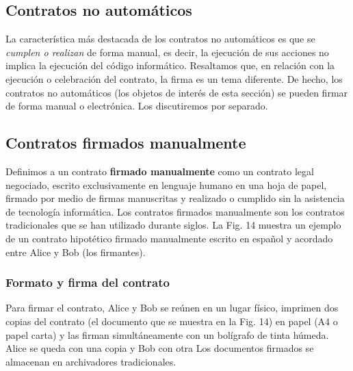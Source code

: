 \documentclass[12pt]{report} %
\begin{document}
\begin{itemize}
\section{ Contratos no automáticos }

La característica más destacada de los contratos no automáticos es que se \textit{cumplen o realizan} de forma manual, es decir, la ejecución de sus acciones no implica la ejecución del código informático. Resaltamos que, en relación con la ejecución o celebración del contrato, la firma es un tema diferente. De hecho, los contratos no automáticos (los objetos de interés de esta sección) se pueden firmar de forma manual o electrónica. Los discutiremos por separado. 

\subsection{Contratos firmados manualmente }


	Definimos a un contrato \textbf{firmado manualmente} como un contrato legal negociado, escrito exclusivamente en lenguaje humano en una hoja de papel, firmado por medio de firmas manuscritas y realizado o cumplido sin la asistencia de tecnología informática. Los contratos firmados manualmente son los contratos tradicionales que se han utilizado durante siglos. La Fig. 14 muestra un ejemplo de un contrato hipotético firmado manualmente escrito en español y acordado entre Alice y Bob (los firmantes). 

\subsubsection{Formato y firma del contrato }

Para firmar el contrato, Alice y Bob se reúnen en un lugar físico, imprimen dos copias del contrato (el documento que se muestra en la Fig. 14) en papel (A4 o papel carta) y las firman simultáneamente con un bolígrafo de tinta húmeda. Alice se queda con una copia y Bob con otra Los documentos firmados se almacenan en archivadores tradicionales.


\end{itemize}
\end{document}
